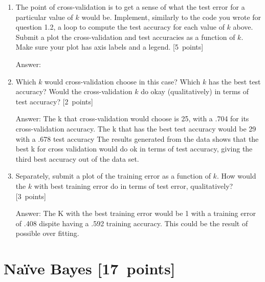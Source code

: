 \documentclass{article}
\newcommand{\blu}[1]{{\textcolor{blu}{#1}}}
\newcommand{\gre}[1]{\textcolor{gre}{#1}}
\newcommand\ans[1]{\par\gre{Answer: #1}}
\let\ask\blu
\newcommand\pts[1]{\textcolor{pointscolour}{[#1~points]}}
\begin{document}
\begin{enumerate}
{            #mark validation examples as false
            mask[start:end] = False

            #train KNN
            model = KNN(depth)
            model.fit(X[mask], y[mask])

            #make predictions, get the accuracy
            model.predict()
            y_predictions = model.predict(X[~mask])
            accuracy = np.mean(y_predictions == y)
            #inputs current accuracy into the array
            fold_accs.append(accuracy)
        #input folds array into the cross validation array 
        cv_accs.append(np.mean(fold_accs))

    print("Current ks: ", ks)
    print("results: ", cv_accs)
}

        \item The point of cross-validation is to get a sense of what the test error for a particular value of $k$ would be. Implement, similarly to the code you wrote for question 1.2, a loop to compute the test accuracy for each value of $k$ above. \ask{Submit a plot the cross-validation and test accuracies as a function of $k$.} Make sure your plot has axis labels and a legend. \pts{5}

        \ans{}
        \item Which $k$ would cross-validation choose in this case? Which $k$ has the best test accuracy? Would the cross-validation $k$ do okay (qualitatively) in terms of test accuracy? \pts{2}

        \ans{The k that cross-validation would choose is 25, with a .704 for its cross-validation accuracy. The k that has the best test accuracy would be 29 with a .678 test accuracy
        The results generated from the data shows that the best k for cross validation would do ok in terms of test accuracy, giving the third best accuracy out of the data set.
        }
        \item Separately, \ask{submit a plot of the training error as a function of $k$. How would the $k$ with best training error do in terms of test error, qualitatively?} \pts{3}
        \ans{The K with the best training error would be 1 with a training error of .408 dispite having a .592 training accuracy. This could be the result of possible over fitting.}
    \end{enumerate}



    \clearpage
    \section{Na\"ive Bayes \pts{17}}
\end{document}
